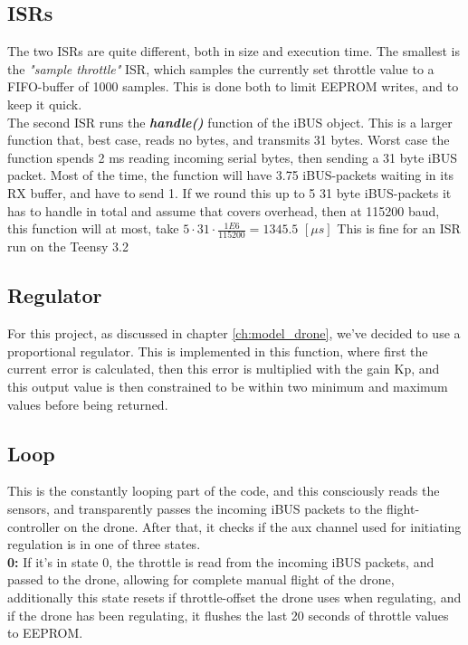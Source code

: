 \subsection*{ISRs}
The two ISRs are quite different, both in size and execution time.
The smallest is the \textit{"sample throttle"} ISR, which samples the currently set throttle value to a FIFO-buffer of 1000 samples. This is done both to limit EEPROM writes, and to keep it quick.\\

The second ISR runs the \textbf{\textit{handle()}} function of the iBUS object. This is a larger function that, best case, reads no bytes, and transmits 31 bytes. 
Worst case the function spends 2 ms reading incoming serial bytes, then sending a 31 byte iBUS packet.
Most of the time, the function will have 3.75 iBUS-packets waiting in its RX buffer, and have to send 1. If we round this up to 5 31 byte iBUS-packets it has to handle in total and assume that covers overhead, then at 115200 baud, this function will at most, take $5 \cdot 31 \cdot \frac{1E6}{115200} = 1345.5$  $[\mu{}s]$ 
This is fine for an ISR run on the Teensy 3.2

\subsection*{Regulator}
For this project, as discussed in chapter \ref{ch:model_drone}, we've decided to use a proportional regulator. This is implemented in this function, where first the current error is calculated, then this error is multiplied with the gain Kp, and this output value is then constrained to be within two minimum and maximum values before being returned. 

\subsection*{Loop}
This is the constantly looping part of the code, and this consciously reads the sensors, and transparently passes the incoming iBUS packets to the flight-controller on the drone. After that, it checks if the aux channel used for initiating regulation is in one of three states.\\

\textbf{0:}
If it's in state 0, the throttle is read from the incoming iBUS packets, and passed to the drone, allowing for complete manual flight of the drone, additionally this state resets if throttle-offset the drone uses when regulating, and if the drone has been regulating, it flushes the last 20 seconds of throttle values to EEPROM.\\

